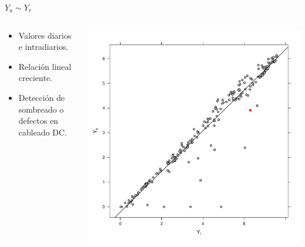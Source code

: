 \documentclass[aspectratio=169, usenames,svgnames,dvipsnames]{beamer}
\begin{document}
\begin{frame}[label={sec:org0c94095}]{\(Y_a \sim Y_r\)}
\begin{columns}
\begin{column}{0.3\columnwidth}
\begin{itemize}
\item Valores diarios e intradiarios.
\item Relación lineal creciente.
\item Detección de sombreado o defectos en cableado DC.
\end{itemize}
\end{column}

\begin{column}{0.7\columnwidth}
\begin{center}
\includegraphics[height=0.95\textheight]{../figs/YaYr.pdf}
\end{center}
\end{column}
\end{columns}
\end{frame}
\end{document}
